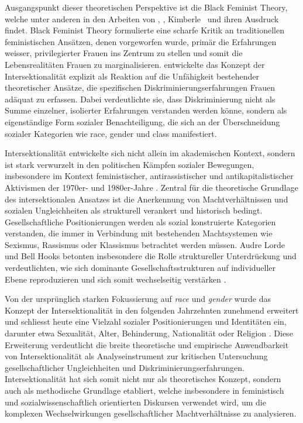 Ausgangspunkt dieser theoretischen Perspektive ist die Black Feminist Theory, welche unter anderen in den Arbeiten von \textcite{hooksAintWomanBlack1981}, \textcite{lordeSisterOutsiderEssays1984}, Kimberle~\textcite{crenshawMappingMarginsIntersectionality1991} und \textcite{collinsBlackFeministThought2002} ihren Ausdruck findet. Black Feminist Theory formulierte eine scharfe Kritik an traditionellen feministischen Ansätzen, denen vorgeworfen wurde, primär die Erfahrungen weisser, privilegierter Frauen ins Zentrum zu stellen und somit die Lebensrealitäten  Frauen zu marginalisieren. \textcite{crenshawMappingMarginsIntersectionality1991} entwickelte das Konzept der Intersektionalität explizit als Reaktion auf die Unfähigkeit bestehender theoretischer Ansätze, die spezifischen Diskriminierungserfahrungen  Frauen adäquat zu erfassen. Dabei verdeutlichte sie, dass Diskriminierung nicht als Summe einzelner, isolierter Erfahrungen verstanden werden könne, sondern als eigenständige Form sozialer Benachteiligung, die sich an der Überschneidung sozialer Kategorien wie \gls{race}, \gls{gender} und \gls{class} manifestiert.

Intersektionalität entwickelte sich nicht allein im akademischen Kontext, sondern ist stark verwurzelt in den politischen Kämpfen sozialer Bewegungen, insbesondere im Kontext feministischer, antirassistischer und antikapitalistischer Aktivismen der 1970er- und 1980er-Jahre \parencite{collinsBlackFeministThought2002}. Zentral für die theoretische Grundlage des intersektionalen Ansatzes ist die Anerkennung von Machtverhältnissen und sozialen Ungleichheiten als strukturell verankert und historisch bedingt. Gesellschaftliche Positionierungen werden als sozial konstruierte Kategorien verstanden, die immer in Verbindung mit bestehenden Machtsystemen wie Sexismus, Rassismus oder Klassismus betrachtet werden müssen. Audre Lorde und Bell Hooks betonten insbesondere die Rolle struktureller Unterdrückung und verdeutlichten, wie sich dominante Gesellschaftsstrukturen auf individueller Ebene reproduzieren und sich somit wechselseitig verstärken \parencite{collinsBlackFeministThought2002, hancockWhenMultiplicationDoesnt2007}.

Von der ursprünglich starken Fokussierung auf \textit{race} und \textit{gender} wurde das Konzept der Intersektionalität in den folgenden Jahrzehnten zunehmend erweitert und schliesst heute eine Vielzahl sozialer Positionierungen und Identitäten ein, darunter etwa Sexualität, Alter, Behinderung, Nationalität oder Religion \parencite{bauerIntersectionalityQuantitativeResearch2021, bowlegInvitedReflectionQuantifying2016}. Diese Erweiterung verdeutlicht die breite theoretische und empirische Anwendbarkeit von Intersektionalität als Analyseinstrument zur kritischen Untersuchung gesellschaftlicher Ungleichheiten und Diskriminierungserfahrungen. Intersektionalität hat sich somit nicht nur als theoretisches Konzept, sondern auch als methodische Grundlage etabliert, welche insbesondere in feministisch und sozialwissenschaftlich orientierten Diskursen verwendet wird, um die komplexen Wechselwirkungen gesellschaftlicher Machtverhältnisse zu analysieren.

